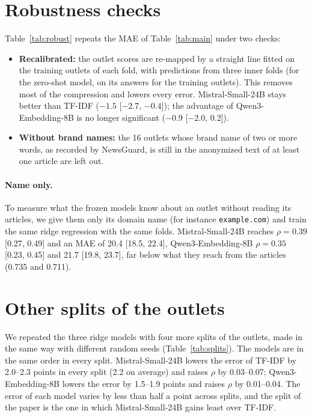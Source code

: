 \documentclass[11pt,a4paper]{article}
\begin{document}
\section{Robustness checks}\label{app:robust}
Table~\ref{tab:robust} repeats the MAE of Table~\ref{tab:main} under two checks:
\begin{itemize}
  \item \textbf{Recalibrated:} the outlet scores are re-mapped by a straight line fitted on the training outlets of each
        fold, with predictions from three inner folds (for the zero-shot model, on its answers for the training
        outlets). This removes most of the compression and lowers every error. Mistral-Small-24B stays better than
        TF-IDF ($-1.5$ [$-2.7$, $-0.4$]); the advantage of Qwen3-Embedding-8B is no longer significant ($-0.9$ [$-2.0$,
        0.2]).
  \item \textbf{Without brand names:} the 16 outlets whose brand name of two or more words, as recorded by NewsGuard, is
        still in the anonymized text of at least one article are left out.
\end{itemize}

\paragraph{Name only.} To measure what the frozen models know about an outlet without reading its articles, we give them
only its domain name (for instance \texttt{example.com}) and train the same ridge regression with the same folds.
Mistral-Small-24B reaches $\rho = 0.39$ [0.27, 0.49] and an MAE of 20.4 [18.5, 22.4], Qwen3-Embedding-8B $\rho = 0.35$
[0.23, 0.45] and 21.7 [19.8, 23.7], far below what they reach from the articles (0.735 and 0.711).


\section{Other splits of the outlets}\label{app:splits}
We repeated the three ridge models with four more splits of the outlets, made in the same way with different random
seeds (Table~\ref{tab:splits}). The models are in the same order in every split. Mistral-Small-24B lowers the error of
TF-IDF by 2.0--2.3 points in every split (2.2 on average) and raises $\rho$ by 0.03--0.07; Qwen3-Embedding-8B lowers the
error by 1.5--1.9 points and raises $\rho$ by 0.01--0.04. The error of each model varies by less than half a point
across splits, and the split of the paper is the one in which Mistral-Small-24B gains least over TF-IDF.
\end{document}
